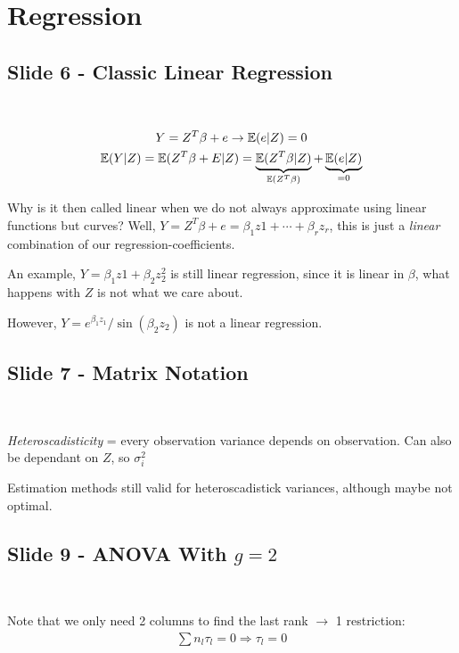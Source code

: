 \section{Regression}
\subsection{Slide 6 - Classic Linear Regression}\hfill\\\par
\begin{equation*}
  \begin{gathered}
    Y = Z^T\beta+e\rightarrow \mathbb{E}(e|Z) = 0\\
    \mathbb{E}(Y|Z) = \mathbb{E}(Z^T\beta+E|Z) = \underbrace{\mathbb{E}(Z^T\beta|Z)}_{\mathbb{E}(Z^T\beta)}+\underbrace{\mathbb{E}(e|Z)}_{\text{=0}}
  \end{gathered}
\end{equation*}
\par\bigskip
\noindent Why is it then called linear when we do not always approximate using linear functions but curves? Well, $Y = Z^T\beta+e = \beta_1z1+\cdots+\beta_rz_r$, this is just a \textit{linear} combination of our regression-coefficients.\par
\noindent An example, $Y = \beta_1z1+\beta_2z_2^2$ is still linear regression, since it is linear in $\beta$, what happens with $Z$ is not what we care about.\par
\noindent However, $Y = e^{\beta_1z_1}/\sin(\beta_2z_2)$ is not a linear regression. 
\par\bigskip
\subsection{Slide 7 - Matrix Notation}\hfill\\\par
\noindent \textit{Heteroscadisticity} = every observation variance depends on observation. Can also be dependant on $Z$, so $\sigma_i^2$
\par\bigskip
\noindent Estimation methods still valid for heteroscadistick variances, although maybe not optimal.
\par\bigskip
\subsection{Slide 9 - ANOVA With $g=2$}\hfill\\
\par\bigskip
\noindent Note that we only need 2 columns to find the last rank $\rightarrow$ 1 restriction:
\begin{equation*}
  \begin{gathered}
    \sum n_l\tau_l = 0\Rightarrow \tau_l=0
  \end{gathered}
\end{equation*}
\par\bigskip
